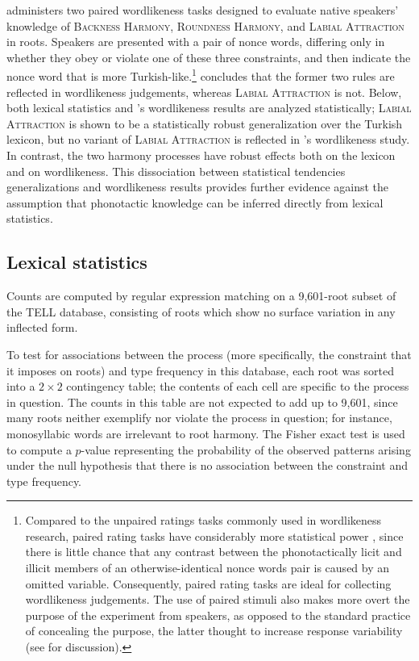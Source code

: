 \citet[311]{Zimmer1969} administers two paired wordlikeness tasks designed to evaluate native speakers' knowledge of \textsc{Backness Harmony}, \textsc{Roundness Harmony}, and \textsc{Labial Attraction} in roots. 
Speakers are presented with a pair of nonce words, differing only in whether they obey or violate one of these three constraints, and then indicate the nonce word that is more Turkish-like.\footnote{
    Compared to the unpaired ratings tasks commonly used in wordlikeness research, paired rating tasks have considerably more statistical power \citep[e.g.][]{Gigerenzer2004}, since there is little chance that any contrast between the phonotactically licit and illicit members of an otherwise-identical nonce words pair is caused by an omitted variable.
    Consequently, paired rating tasks are ideal for collecting wordlikeness judgements.
    The use of paired stimuli also makes more overt the purpose of the experiment from speakers, as opposed to the standard practice of concealing the purpose, the latter thought to increase response variability (see \citealt[398f.]{Hertwig2001} for discussion).}
\citeauthor{Zimmer1969} concludes that the former two rules are reflected in wordlikeness judgements, whereas \textsc{Labial Attraction} is not. 
Below, both lexical statistics and \citeauthor{Zimmer1969}'s wordlikeness results are analyzed statistically; \textsc{Labial Attraction} is shown to be a statistically robust generalization over the Turkish lexicon, but no variant of \textsc{Labial Attraction} is reflected in \citeauthor{Zimmer1969}'s wordlikeness study. 
In contrast, the two harmony processes have robust effects both on the lexicon and on wordlikeness.  
This dissociation between statistical tendencies  generalizations and wordlikeness results provides further evidence against the assumption that phonotactic knowledge can be inferred directly from lexical statistics.

\subsection{Lexical statistics}

Counts are computed by regular expression matching on a 9,601-root subset of the TELL database, consisting of roots which show no surface variation in any inflected form.

To test for associations between the process (more specifically, the constraint that it imposes on roots) and type frequency in this database, each root was sorted into a $2 \times 2$ contingency table; the contents of each cell are specific to the process in question.
The counts in this table are not expected to add up to 9,601, since many roots neither exemplify nor violate the process in question; for instance, monosyllabic words are irrelevant to root harmony.
The Fisher exact test is used to compute a $p$-value representing the probability of the observed patterns arising under the null hypothesis that there is no association between the constraint and type frequency.

